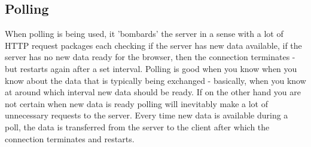 \subsection{Polling}

When polling is being used, it 'bombards' the server in a sense with a lot of 
HTTP request packages each checking if the server has new data available, if 
the server has no new data ready for the browser, then the connection 
terminates - but restarts again after a set interval\cite{lubbersgreco}. 
Polling is good when you know when you know about the data that is typically 
being exchanged\cite{lubbersgreco} - basically, when you know at around which 
interval new data should be ready. If on the other hand you are not certain 
when new data is ready polling will inevitably make a lot of unnecessary 
requests to the server\cite{lubbersgreco}. Every time new data is available 
during a poll, the data is transferred from the server to the client after 
which the connection terminates and restarts\cite{lubbersgreco}.